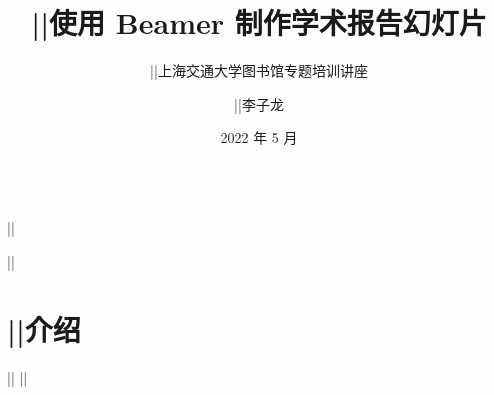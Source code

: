 \begin{frame}[fragile]
\begin{columns}
\begin{column}{0.6\textwidth}
\begin{codeblock}[]{}
  \title{|\phantom{}|使用 Beamer 制作学术报告幻灯片}
  \subtitle{|\phantom{}|上海交通大学图书馆专题培训讲座}
  \author{|\phantom{}|李子龙}
  \date{2022 年 5 月}
||  \maketitle
||  \part{|\phantom{}|介绍}
||  \makebottom
|\phantom{}|
      \end{codeblock}
    \end{column}
    \begin{column}{0.4\textwidth}
\end{column}
\end{columns}
\end{frame}
